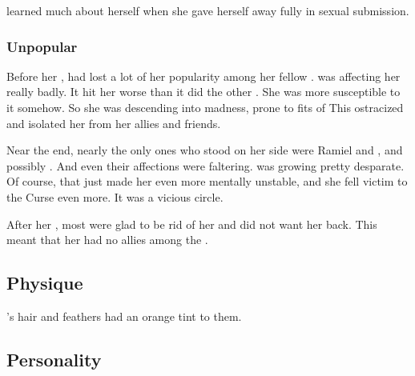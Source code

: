 \Shiaraid{} learned much about herself when she gave herself away fully in sexual submission. 






\subsubsection{Unpopular}
Before her \kenosis, \Shiaraid{} had lost a lot of her popularity among her fellow \resphain. 
 was affecting her really badly. 
It hit her worse than it did the other \satharioth. 
She was more susceptible to it somehow. 
So she was descending into madness, prone to fits of 
This ostracized and isolated her from her allies and friends. 

Near the end, nearly the only ones who stood on her side were Ramiel and \Eryal, and possibly \Cishiel. 
And even their affections were faltering. 
\Shiaraid{} was growing pretty desparate. 
Of course, that just made her even more mentally unstable, and she fell victim to the Curse even more. 
It was a vicious circle. 

After her \kenosis, most \resphain{} were glad to be rid of her and did not want her back. 
This meant that her  had no allies among the \resphain. 









\subsection{Physique}
\Shiaraid's hair and feathers had an orange tint to them. 









\subsection{Personality}





